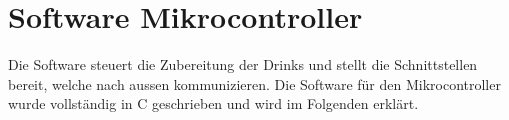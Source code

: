 \clearpage
\section{Software Mikrocontroller}\label{sec:Software_Mikrocontroller}

Die Software steuert die Zubereitung der Drinks und stellt die Schnittstellen bereit, welche nach aussen kommunizieren.
Die Software für den Mikrocontroller wurde vollständig in C geschrieben und wird im Folgenden erklärt.